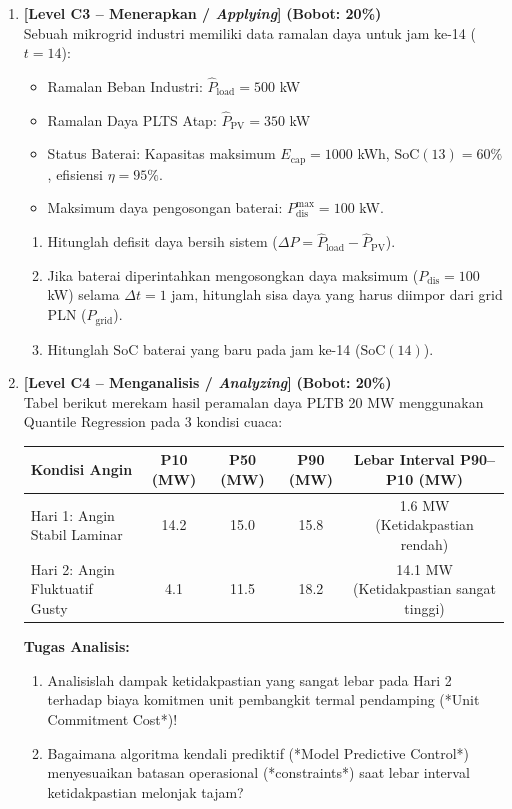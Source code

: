 \documentclass[11pt,a4paper]{article}
\begin{document}
\begin{enumerate}[leftmargin=1.5em, label=\textbf{Soal \arabic*.}]
    \item \textbf{[Level C3 -- Menerapkan / \textit{Applying}]} \hfill \textbf{(Bobot: 20\%)} \\
    Sebuah mikrogrid industri memiliki data ramalan daya untuk jam ke-14 ($t=14$):
    \begin{itemize}
        \item Ramalan Beban Industri: $\hat{P}_{\text{load}} = 500$ kW
        \item Ramalan Daya PLTS Atap: $\hat{P}_{\text{PV}} = 350$ kW
        \item Status Baterai: Kapasitas maksimum $E_{\text{cap}} = 1000$ kWh, $\text{SoC}(13) = 60\%$, efisiensi $\eta = 95\%$.
        \item Maksimum daya pengosongan baterai: $P_{\text{dis}}^{\max} = 100$ kW.
    \end{itemize}
    \begin{enumerate}[label=\alph*.]
        \item Hitunglah defisit daya bersih sistem ($\Delta P = \hat{P}_{\text{load}} - \hat{P}_{\text{PV}}$).
        \item Jika baterai diperintahkan mengosongkan daya maksimum ($P_{\text{dis}} = 100$ kW) selama $\Delta t = 1$ jam, hitunglah sisa daya yang harus diimpor dari grid PLN ($P_{\text{grid}}$).
        \item Hitunglah $\text{SoC}$ baterai yang baru pada jam ke-14 ($\text{SoC}(14)$).
    \end{enumerate}

    \newpage

    \item \textbf{[Level C4 -- Menganalisis / \textit{Analyzing}]} \hfill \textbf{(Bobot: 20\%)} \\
    Tabel berikut merekam hasil peramalan daya PLTB 20 MW menggunakan Quantile Regression pada 3 kondisi cuaca:
    \begin{center}
    \begin{tabular}{|l|c|c|c|c|}
    \hline
    \rowcolor{boxbg}
    \textbf{Kondisi Angin} & \textbf{P10 (MW)} & \textbf{P50 (MW)} & \textbf{P90 (MW)} & \textbf{Lebar Interval P90--P10 (MW)} \\ \hline
    Hari 1: Angin Stabil Laminar & 14.2 & 15.0 & 15.8 & 1.6 MW (Ketidakpastian rendah) \\ \hline
    Hari 2: Angin Fluktuatif Gusty & 4.1 & 11.5 & 18.2 & 14.1 MW (Ketidakpastian sangat tinggi) \\ \hline
    \end{tabular}
    \end{center}
    \textbf{Tugas Analisis:}
    \begin{enumerate}[label=\alph*.]
        \item Analisislah dampak ketidakpastian yang sangat lebar pada Hari 2 terhadap biaya komitmen unit pembangkit termal pendamping (*Unit Commitment Cost*)!
        \item Bagaimana algoritma kendali prediktif (*Model Predictive Control*) menyesuaikan batasan operasional (*constraints*) saat lebar interval ketidakpastian melonjak tajam?
    \end{enumerate}


\end{enumerate}
\end{document}
